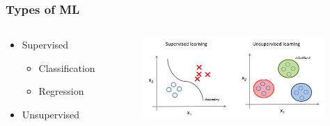 \documentclass{beamer}
\begin{document}
\begin{frame}
    \frametitle{Types of ML}
    \begin{columns}[T] %
        \begin{column}{.35\textwidth}
            \begin{itemize}
                \item Supervised 
                \begin{itemize}
                    \item Classification
                    \item Regression
                \end{itemize}
                \item Unsupervised
            \end{itemize}
        \end{column}%
        \hfill%
        \begin{column}{.7\textwidth}
            \includegraphics[height=3cm,keepaspectratio]{pics/supervised_vs_unsupervised.png}%
            
        \end{column}%
    \end{columns}
\end{frame}

\end{document}
